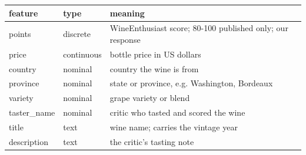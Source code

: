 \begin{tabular}{lll}
\toprule
\textbf{feature} & \textbf{type} & \textbf{meaning} \\
\midrule
points & discrete & WineEnthusiast score; 80-100 published only; our response \\
price & continuous & bottle price in US dollars \\
country & nominal & country the wine is from \\
province & nominal & state or province, e.g. Washington, Bordeaux \\
variety & nominal & grape variety or blend \\
taster\_name & nominal & critic who tasted and scored the wine \\
title & text & wine name; carries the vintage year \\
description & text & the critic's tasting note \\
\bottomrule
\end{tabular}
